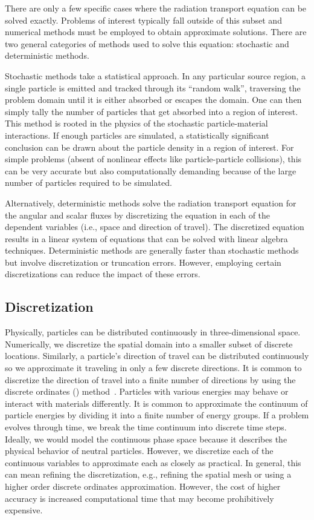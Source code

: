 \documentclass[12pt,letterpaper]{article}
\begin{document}
There are only a few specific cases where the radiation transport equation can be solved exactly. Problems of interest typically fall outside of this subset and numerical methods must be employed to obtain approximate solutions. There are two general categories of methods used to solve this equation: stochastic and deterministic methods.

Stochastic methods take a statistical approach. In any particular source region, a single particle is emitted and tracked through its ``random walk'', traversing the problem domain until it is either absorbed or escapes the domain. One can then simply tally the number of particles that get absorbed into a region of interest. This method is rooted in the physics of the stochastic particle-material interactions. If enough particles are simulated, a statistically significant conclusion can be drawn about the particle density in a region of interest. For simple problems (absent of nonlinear effects like particle-particle collisions), this can be very accurate but also computationally demanding because of the large number of particles required to be simulated.

Alternatively, deterministic methods solve the radiation transport equation for the angular and scalar fluxes by discretizing the equation in each of the dependent variables (i.e., space and direction of travel). The discretized equation results in a linear system of equations that can be solved with linear algebra techniques. Deterministic methods are generally faster than stochastic methods but involve discretization or truncation errors. However, employing certain discretizations can reduce the impact of these errors.

\subsection{Discretization}
\label{sec:DiscretizationIntro}
Physically, particles can be distributed continuously in three-dimensional space. Numerically, we discretize the spatial domain into a smaller subset of discrete locations. Similarly, a particle's direction of travel can be distributed continuously so we approximate it traveling in only a few discrete directions. It is common to discretize the direction of travel into a finite number of directions by using the discrete ordinates (\SN) method~\cite{discrete_ordinates}. Particles with various energies may behave or interact with materials differently. It is common to approximate the continuum of particle energies by dividing it into a finite number of energy groups. If a problem evolves through time, we break the time continuum into discrete time steps. Ideally, we would model the continuous phase space because it describes the physical behavior of neutral particles. However, we discretize each of the continuous variables to approximate each as closely as practical. In general, this can mean refining the discretization, e.g., refining the spatial mesh or using a higher order discrete ordinates approximation. However, the cost of higher accuracy is increased computational time that may become prohibitively expensive.
\end{document}

